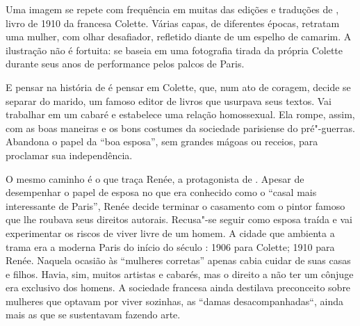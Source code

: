 \pagebreak 

\begin{changemargin}
\hspace{.5cm}
\vspace*{1cm}
\enlargethispage{-\baselineskip}


\bigskip

\hfill{}

\bigskip

Uma imagem se repete com frequência em muitas das edições e traduções de {}, livro de 1910 da francesa Colette. Várias capas, de diferentes épocas, retratam uma mulher, com olhar desafiador, refletido diante de um espelho de camarim. A ilustração não é fortuita: se baseia em uma fotografia tirada da própria Colette durante seus anos de performance pelos palcos de Paris. 

E pensar na história de {} é pensar em Colette, que, num ato de coragem, decide se separar do marido, um famoso editor de livros que usurpava seus textos. Vai trabalhar em um cabaré e estabelece uma relação homossexual. Ela rompe, assim, com as boas maneiras e os bons costumes da sociedade parisiense do pré"-guerras. Abandona o papel da “boa esposa”, sem grandes mágoas ou receios, para proclamar sua independência.

O mesmo caminho é o que traça Renée, a protagonista de {}. Apesar de desempenhar o papel de esposa no que era conhecido como o “casal mais interessante de Paris”, Renée decide terminar o casamento com o pintor famoso que lhe roubava seus direitos autorais. Recusa"-se seguir como esposa traída e vai experimentar os riscos de viver livre de um homem. A cidade que ambienta a trama era a moderna Paris do início do século : 1906 para Colette; 1910 para Renée. Naquela ocasião às “mulheres corretas” apenas cabia cuidar de suas casas e filhos. Havia, sim, muitos artistas e cabarés, mas o direito a não ter um cônjuge era exclusivo dos homens. A sociedade francesa ainda destilava preconceito sobre mulheres que optavam por viver sozinhas, as “damas desacompanhadas“, ainda mais as que se sustentavam fazendo arte.


\end{changemargin}

